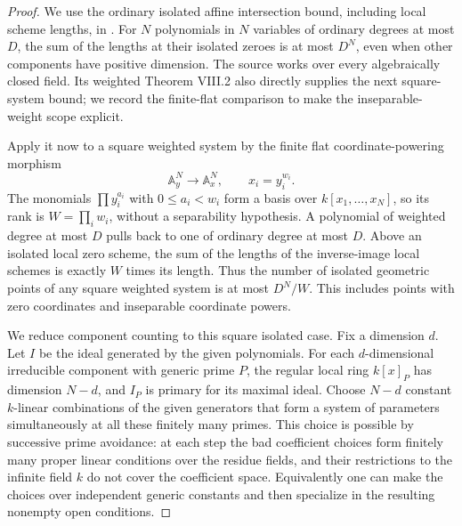 \begin{proof}
We use the ordinary isolated affine intersection bound, including
local scheme lengths, in \citet[Section IV.4.2, equations
(38)--(39), Proposition IV.28, and Corollary VIII.3 following
Theorem VIII.2, pp.~70--71 and 143--144]{Mondal2021WeightedD}.
For $N$ polynomials in $N$ variables of ordinary degrees at
most $D$, the sum of the lengths at their isolated zeroes is
at most $D^N$, even when other components have positive
dimension. The source works over every algebraically closed
field. Its weighted Theorem VIII.2 also directly supplies
the next square-system bound; we record the finite-flat
comparison to make the inseparable-weight scope explicit.

Apply it now to a square weighted system by the finite flat
coordinate-powering morphism
\[
 \mathbb A^N_y\longrightarrow\mathbb A^N_x,
                   \qquad x_i=y_i^{w_i}.                 \tag{D.WB.2}
\]
The monomials $\prod y_i^{a_i}$ with $0\leq a_i<w_i$ form
a basis over $k[x_1,\ldots,x_N]$, so its rank is
$W=\prod_i w_i$, without a separability hypothesis.
A polynomial of weighted degree at most $D$ pulls back to
one of ordinary degree at most $D$. Above an isolated local
zero scheme, the sum of the lengths of the inverse-image local
schemes is exactly $W$ times its length. Thus the number of
isolated geometric points of any square weighted system is
at most $D^N/W$. This includes points with zero coordinates
and inseparable coordinate powers.

We reduce component counting to this square isolated case.
Fix a dimension $d$. Let $I$ be the ideal generated by the
given polynomials. For each $d$-dimensional irreducible
component with generic prime $P$, the regular local ring
$k[x]_P$ has dimension $N-d$, and $I_P$ is primary for its
maximal ideal. Choose $N-d$ constant $k$-linear combinations
of the given generators that form a system of parameters
simultaneously at all these finitely many primes. This
choice is possible by successive prime avoidance: at each
step the bad coefficient choices form finitely many proper
linear conditions over the residue fields, and their
restrictions to the infinite field $k$ do not cover the
coefficient space. Equivalently one can make the choices
over independent generic constants and then specialize in
the resulting nonempty open conditions.


\end{proof}
